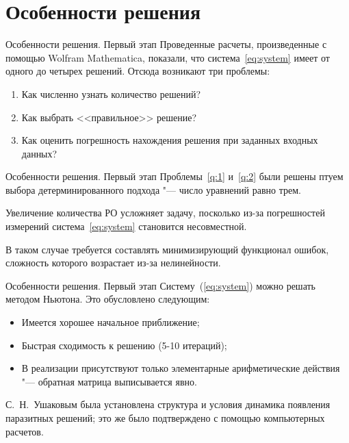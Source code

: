 \documentclass[russian,hyperref={unicode}]{beamer}
\begin{document}
  \section{Особенности решения}
  \begin{frame}{Особенности решения. Первый этап}
    Проведенные расчеты, произведенные с помощью Wolfram Mathematica, показали, что система~\eqref{eq:system} имеет от одного до четырех решений. Отсюда возникают три проблемы:
    \begin{enumerate}
      \item Как численно узнать количество решений? \label{q:1}
      \item Как выбрать <<правильное>> решение? \label{q:2}
      \item Как оценить погрешность нахождения решения при заданных входных данных? \label{q:3}
    \end{enumerate}

  \end{frame}

  \begin{frame}{Особенности решения. Первый этап}
    Проблемы~\ref{q:1} и~\ref{q:2} были решены птуем выбора детерминированного подхода "--- число уравнений равно трем.

    Увеличение количества РО усложняет задачу, посколько из-за погрешностей измерений система~\eqref{eq:system} становится несовместной.

    В таком случае требуется составлять минимизирующий функционал ошибок, сложность которого возрастает из-за нелинейности.
  \end{frame}

  \begin{frame}{Особенности решения. Первый этап}
    Систему~(\ref{eq:system}) можно решать методом Ньютона. Это обусловлено следующим:
    \begin{itemize}
      \item Имеется хорошее начальное приближение;
      \item Быстрая сходимость к решению (5-10 итераций);
      \item В реализации присутствуют только элементарные арифметические действия "--- обратная матрица выписывается явно.
    \end{itemize}

    С.~Н.~Ушаковым была установлена структура и условия динамика появления паразитных решений; это же было подтверждено с помощью компьютерных расчетов.
  \end{frame}
\end{document}
